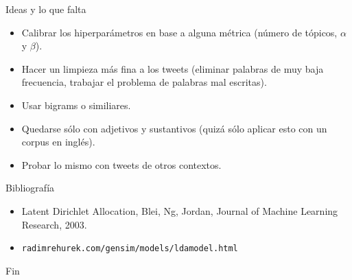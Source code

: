 \documentclass{beamer}
\begin{document}
	\begin{frame}{Ideas y lo que falta}
		\begin{itemize}
			\item Calibrar los hiperparámetros en base a alguna métrica (número de tópicos, $\alpha$ y $\beta$). 
			\item Hacer un limpieza más fina a los tweets (eliminar palabras de muy baja frecuencia, trabajar el problema de palabras mal escritas).
			\item Usar bigrams o similiares.
			\item Quedarse sólo con adjetivos y sustantivos (quizá sólo aplicar esto con un corpus en inglés).
			\item Probar lo mismo con tweets de otros contextos.
		\end{itemize}
	\end{frame}

	\begin{frame}{Bibliografía}
		\begin{itemize}
			\item Latent Dirichlet Allocation, Blei, Ng, Jordan, Journal of Machine Learning Research, 2003.
			\item  \texttt{radimrehurek.com/gensim/models/ldamodel.html}
		\end{itemize}
	\end{frame}
	

	\begin{frame}{Fin}
		\centering
	\end{frame}

	
	
\end{document}
